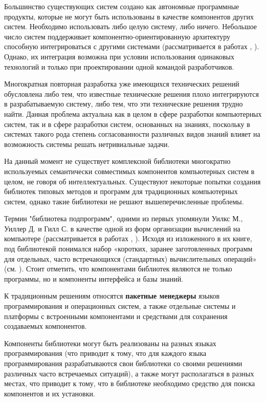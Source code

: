Большинство существующих систем создано как автономные программные продукты, которые не могут быть использованы в качестве компонентов других систем. Необходимо использовать либо целую систему, либо ничего. Небольшое число систем поддерживает компонентно-ориентированную архитектуру способную интегрироваться с другими системами (рассматривается в работах , ). Однако, их интеграция возможна при условии использования одинаковых технологий и только при проектировании одной командой разработчиков.

Многократная повторная разработка уже имеющихся технических решений обусловлена либо тем, что известные технические решения плохо интегрируются в разрабатываемую систему, либо тем, что эти технические решения трудно найти. Данная проблема актуальна как в целом в сфере разработки компьютерных систем, так и в сфере разработки систем, основанных на знаниях, поскольку в системах такого рода степень согласованности различных видов знаний влияет на возможность системы решать нетривиальные задачи.

На данный момент не существует комплексной библиотеки многократно используемых семантически совместимых компонентов компьютерных систем в целом, не говоря об интеллектуальных. Существуют некоторые попытки создания библиотек типовых методов и программ для традиционных компьютерных систем, однако такие библиотеки не решают вышеперечисленные проблемы.

Термин "библиотека подпрограмм"{}, одними из первых упомянули Уилкс М., Уиллер Д. и Гилл С. в качестве одной из форм организации вычислений на компьютере (рассматривается в работах , ). Исходя из изложенного в их книге, под библиотекой понимался набор «коротких, заранее заготовленных программ для отдельных, часто встречающихся (стандартных) вычислительных операций» (см. ). Стоит отметить, что компонентами библиотек являются не только программы, но и компоненты интерфейса и базы знаний.

К традиционным решениям относятся \textbf{пакетные менеджеры} языков программирования и операционных систем, а также отдельные системы и платформы с встроенными компонентами и средствами для сохранения создаваемых компонентов.

Компоненты библиотеки могут быть реализованы на разных языках программирования (что приводит к тому, что для каждого языка программирования разрабатываются свои библиотеки со своими решениями различных часто встречаемых ситуаций), а также могут располагаться в разных местах, что приводит к тому, что в библиотеке необходимо средство для поиска компонентов и их установки.

